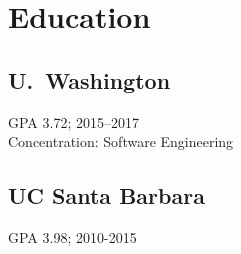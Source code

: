 \section{Education}

\subsection{U.~Washington}
GPA 3.72; 2015--2017 \\
Concentration: Software Engineering \\
\sectionsep

\subsection{UC Santa Barbara}
GPA 3.98; 2010-2015
\sectionsep
